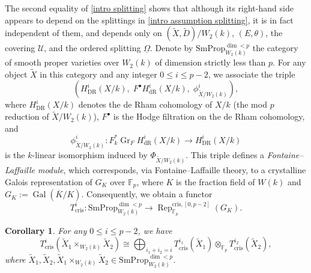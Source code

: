 \documentclass[12pt, a4paper]{article}
\newtheorem{corollary}{Corollary}[section]
\begin{document}
The second equality of \eqref{intro splitting} shows that although its right-hand side appears to depend on the splittings in \eqref{intro assumption splitting}, it is in fact independent of them, and depends only on $(\tilde X,\tilde D)/W_2(k)$, $(E,\theta)$, the covering $\mathcal U$, and the ordered splitting $\underline\Omega$.
\iffalse
Denote by $\mathrm{SmProp}_{W_2(k)}^{\dim < p}$ the category of smooth proper varieties over $W_2(k)$ of dimension strictly less than $p$. For any object $\tilde{X}$ in this category and any integer $0\leq i\leq p-2$, we associate the triple
\[
\left( H_{\mathrm{DR}}^i(X/k),\; F^\bullet H_{\mathrm{dR}}^i(X/k),\; \phi^i_{\tilde{X}/W_2(k)} \right),
\]
where $H_{\mathrm{DR}}^i(X/k)$ denotes the de Rham cohomology of $X/k$ (the mod $p$ reduction of $\tilde{X}/W_2(k)$), $F^\bullet$ is the Hodge filtration on the de Rham cohomology, and
\[
\phi^i_{\tilde{X}/W_2(k)} \colon F_k^* \operatorname{Gr}_FH_{\mathrm{dR}}^i(X/k) \longrightarrow H_{\mathrm{DR}}^i(X/k)
\]
is the $k$-linear isomorphism induced by $\Phi_{\tilde{X}/W_2(k)}$. This triple defines a \emph{Fontaine--Laffaille module}, which corresponds, via Fontaine--Laffaille theory, to a crystalline Galois representation of $G_K$ over $\mathbb{F}_p$, where $K$ is the fraction field of $W(k)$ and $G_K := \operatorname{Gal}(\overline{K}/K)$. Consequently, we obtain a functor
\[
T_\mathrm{cris}^i \colon \mathrm{SmProp}_{W_2(k)}^{\dim < p} \longrightarrow \operatorname{Rep}_{\mathbb{F}_p}^{\mathrm{cris}, [0, p-2]}(G_K).
\]
\begin{corollary}
For any $0\leq i\leq p-2$, we have
$$
T_\mathrm{cris}^i(\tilde X_1\times_{W_2(k)}\tilde X_2)\cong\bigoplus_{i_1+i_2=i}T_\mathrm{cris}^{i_1}(\tilde X_1)\otimes_{\mathbb F_p}T_\mathrm{cris}^{i_2}(\tilde X_2),
$$
where $\tilde X_1,\tilde X_2,\tilde X_1\times_{W_2(k)}\tilde X_2\in\mathrm{SmProp}_{W_2(k)}^{\dim<p}$.
\end{corollary}
\end{document}
